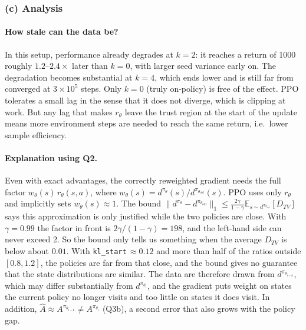 \documentclass[11pt]{article}
\newcommand{\piold}{\pi_{\theta_{\mathrm{old}}}}
\newcommand{\Ahat}{\hat{A}}
\newcommand{\E}{\mathbb{E}}
\newcommand{\code}[1]{\texttt{#1}}
\begin{document}
\subsubsection*{(c) Analysis}

\paragraph{How stale can the data be?}
In this setup, performance already degrades at $k=2$: it reaches a return of 1000 roughly $1.2$--$2.4\times$ later than $k=0$, with larger seed
variance early on. The degradation becomes substantial at $k=4$, which ends lower and is still far from
converged at $3\times10^5$ steps. Only $k=0$ (truly on-policy) is free of the effect. PPO tolerates a small
lag in the sense that it does not diverge, which is clipping at work. But any lag that makes $r_\theta$
leave the trust region at the start of the update means more environment steps are needed to
reach the same return, i.e.\ lower sample efficiency.

\paragraph{Explanation using Q2.}
Even with exact advantages, the correctly reweighted gradient needs the full factor
$w_\theta(s)\,r_\theta(s,a)$, where $w_\theta(s)=d^{\pi_\theta}(s)/d^{\piold}(s)$. PPO uses only
$r_\theta$ and implicitly sets $w_\theta(s)\approx1$. The bound
$\|d^{\pi_\theta}-d^{\piold}\|_1\le\frac{2\gamma}{1-\gamma}\E_{s\sim d^{\piold}}[D_{TV}]$ says
this approximation is only justified while the two policies are close. With $\gamma=0.99$ the
factor in front is $2\gamma/(1-\gamma)=198$, and the left-hand side can never exceed 2. So the
bound only tells us something when the average $D_{TV}$ is below about $0.01$. With
\code{kl\_start}$\,\approx0.12$ and more than half of the ratios outside $[0.8,1.2]$, the
policies are far from that close, and the bound gives no guarantee that the state
distributions are similar. The data are therefore drawn from $d^{\pi_{\theta_{i-k}}}$, which may
differ substantially from $d^{\pi_{\theta_i}}$, and the gradient puts weight on states the
current policy no longer visits and too little on states it does visit. In addition, $\Ahat\approx A^{\pi_{\theta_{i-k}}}\neq A^{\pi_{\theta_i}}$ (Q3b), a
second error that also grows with the policy gap.
\end{document}
